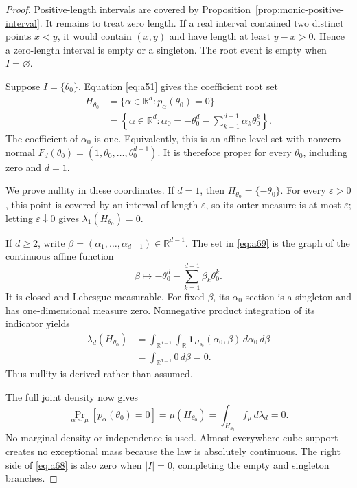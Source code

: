 \begin{proof}
Positive-length intervals are covered by
Proposition~\ref{prop:monic-positive-interval}.  It remains to treat zero
length.  If a real interval contained two distinct points $x<y$, it would
contain $(x,y)$ and have length at least $y-x>0$.  Hence a zero-length
interval is empty or a singleton.  The root event is empty when
$I=\varnothing$.

Suppose $I=\{\theta_0\}$.  Equation \eqref{eq:a51} gives the coefficient
root set
\[
\begin{aligned}
H_{\theta_0}
&=\{\alpha\in\mathbb R^d:p_\alpha(\theta_0)=0\}\\
&=\left\{\alpha\in\mathbb R^d:
 \alpha_0=-\theta_0^d-\sum_{k=1}^{d-1}\alpha_k\theta_0^k\right\}.
\end{aligned}
\tag{A69}\label{eq:a69}
\]
The coefficient of $\alpha_0$ is one.  Equivalently, this is an affine
level set with nonzero normal
$F_d(\theta_0)=(1,\theta_0,\ldots,\theta_0^{d-1})$.  It is therefore
proper for every $\theta_0$, including zero and $d=1$.

We prove nullity in these coordinates.  If $d=1$, then
$H_{\theta_0}=\{-\theta_0\}$.  For every $\varepsilon>0$, this point is
covered by an interval of length $\varepsilon$, so its outer measure is at
most $\varepsilon$; letting $\varepsilon\downarrow0$ gives
$\lambda_1(H_{\theta_0})=0$.

If $d\geq2$, write
$\beta=(\alpha_1,\ldots,\alpha_{d-1})\in\mathbb R^{d-1}$.  The set in
\eqref{eq:a69} is the graph of the continuous affine function
\[
\beta\longmapsto-\theta_0^d-
\sum_{k=1}^{d-1}\beta_k\theta_0^k.
\]
It is closed and Lebesgue measurable.  For fixed $\beta$, its
$\alpha_0$-section is a singleton and has one-dimensional measure zero.
Nonnegative product integration of its indicator yields
\[
\begin{aligned}
\lambda_d(H_{\theta_0})
&=\int_{\mathbb R^{d-1}}\int_{\mathbb R}
 \mathbf 1_{H_{\theta_0}}(\alpha_0,\beta)
 \,d\alpha_0\,d\beta\\
&=\int_{\mathbb R^{d-1}}0\,d\beta=0.
\end{aligned}
\tag{A70}\label{eq:a70}
\]
Thus nullity is derived rather than assumed.

The full joint density now gives
\[
\Pr_{\alpha\sim\mu}[p_\alpha(\theta_0)=0]
=\mu(H_{\theta_0})
=\int_{H_{\theta_0}}f_\mu\,d\lambda_d=0.
\tag{A71}\label{eq:a71}
\]
No marginal density or independence is used.  Almost-everywhere cube
support creates no exceptional mass because the law is absolutely
continuous.  The right side of \eqref{eq:a68} is also zero when
$|I|=0$, completing the empty and singleton branches.
\end{proof}

